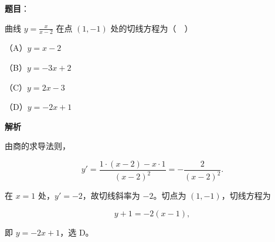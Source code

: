 \begin{answer}

\textbf{题目}：

曲线 $y=\frac{x}{x-2}$ 在点 $(1,-1)$ 处的切线方程为（　）

（A）$y=x-2$

（B）$y=-3x+2$

（C）$y=2x-3$

（D）$y=-2x+1$

\textbf{解析}

由商的求导法则，

\nopagebreak[4]
\[y'=\frac{1\cdot(x-2)-x\cdot1}{(x-2)^2}
=-\frac{2}{(x-2)^2}.\]

在 $x=1$ 处，$y'=-2$，故切线斜率为 $-2$。切点为 $(1,-1)$，切线方程为

\nopagebreak[4]
\[y+1=-2(x-1),\]

即 $y=-2x+1$，选 D。


\end{answer}
